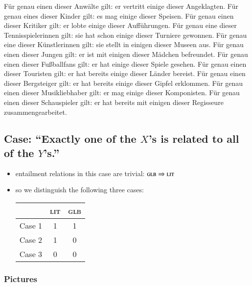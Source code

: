 \documentclass[fleqn,reqno,10pt,draft]{article}
\newcommand{\lit}{\ensuremath{\text{\textsc{lit}}}}
\newcommand{\glb}{\ensuremath{\text{\textsc{glb}}}}
\begin{document}
\begin{exe}
  \ex
    \begin{xlist}
    \ex Für genau einen dieser Anwälte gilt: er vertritt einige dieser
      Angeklagten.
    \ex Für genau eines dieser Kinder gilt: es mag einige dieser
      Speisen.
    \ex Für genau einen dieser Kritiker gilt: er lobte einige dieser
      Aufführungen.
    \ex Für genau eine dieser Tennisspielerinnen gilt: sie hat schon
      einige dieser Turniere gewonnen.
    \ex Für genau eine dieser Künstlerinnen gilt: sie stellt in einigen
      dieser Museen aus.
    \ex Für genau einen dieser Jungen gilt: er ist mit einigen dieser
      Mädchen befreundet.
    \ex Für genau einen dieser Fußballfans gilt: er hat einige dieser
      Spiele gesehen.
    \ex Für genau einen dieser Touristen gilt: er hat bereits einige dieser
      Länder bereist.
    \ex Für genau einen dieser Bergsteiger gilt: er hat bereits einige dieser
      Gipfel erklommen.
    \ex Für genau einen dieser Musikliebhaber gilt: er mag einige
      dieser Komponisten.
    \ex Für genau einen dieser Schauspieler gilt: er hat bereits mit einigen dieser
      Regisseure zusammengearbeitet.
    \end{xlist}
\end{exe}


\subsection{Case: ``Exactly one of the $X$'s is related to all of the
  $Y$'s.''}
\label{sec:case:-exactly1-all}

\begin{itemize}
\item entailment relations in this case are trivial: $\glb \Rightarrow \lit$
\item so we distinguish the following three cases:
\begin{center}
    \begin{tabular}{lcc}
      \toprule
      & \textsc{lit} & \textsc{glb} \\ \midrule
      Case 1 & 1 & 1  \\
      Case 2 & 1 & 0  \\
      Case 3 & 0 & 0  \\ \bottomrule
    \end{tabular}
  \end{center}
\end{itemize}

\subsubsection{Pictures}
\label{sec:pictures}
\end{document}
